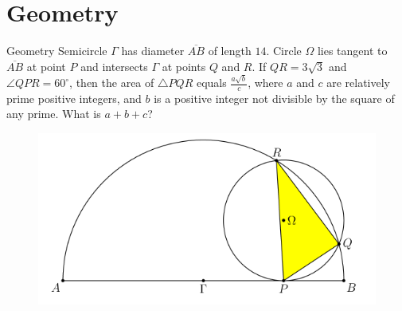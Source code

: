 \documentclass[professionalfont, 12pt, handout, t]{beamer} %
\theoremstyle{plain}
\theoremstyle{definition}
\begin{document}


\section{Geometry}

\begin{frame}{Geometry}
    Semicircle $\Gamma$ has diameter $\overline{AB}$ of length $14$.
    Circle $\Omega$ lies tangent to $\overline{AB}$ at point $P$ and intersects $\Gamma$ at points $Q$ and $R$.
    If $QR = 3\sqrt{3}$ and $\angle QPR = 60^\circ$, then the area of $\triangle PQR$ equals $\frac{a\sqrt{b}}{c}$, where $a$ and $c$ are relatively prime positive integers, and $b$ is a positive integer not divisible by the square of any prime.
    What is $a+b+c$?
    
    \begin{figure}[h]
        \centering
        \includegraphics[scale=0.5]{Geometry}
    \end{figure}
\end{frame}
\end{document}
